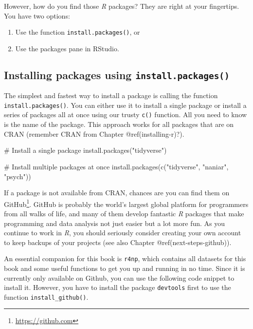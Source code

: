 \documentclass[
  letterpaper,
]{krantz}
\makeatletter
\newenvironment{Shaded}{\begin{snugshade}}{\end{snugshade}}
\newcommand{\CommentTok}[1]{\textcolor[rgb]{0.37,0.37,0.37}{#1}}
\newcommand{\FunctionTok}[1]{\textcolor[rgb]{0.28,0.35,0.67}{#1}}
\newcommand{\NormalTok}[1]{\textcolor[rgb]{0.00,0.23,0.31}{#1}}
\newcommand{\StringTok}[1]{\textcolor[rgb]{0.13,0.47,0.30}{#1}}
\renewcommand{\href}[2]{#2\footnote{\url{#1}}}
\newenvironment{kframe}{%
\medskip{}
\setlength{\fboxsep}{.8em}
 \def\at@end@of@kframe{}%
 \ifinner\ifhmode%
  \def\at@end@of@kframe{\end{minipage}}%
  \begin{minipage}{\columnwidth}%
 \fi\fi%
 \def\FrameCommand##1{\hskip\@totalleftmargin \hskip-\fboxsep
 \colorbox{shadecolor}{##1}\hskip-\fboxsep
     \hskip-\linewidth \hskip-\@totalleftmargin \hskip\columnwidth}%
 \MakeFramed {\advance\hsize-\width
   \@totalleftmargin\z@ \linewidth\hsize
   \@setminipage}}%
 {\par\unskip\endMakeFramed%
 \at@end@of@kframe}
\renewenvironment{Shaded}{\begin{kframe}}{\end{kframe}}
\makeatother
\begin{document}
However, how do you find those \emph{R} packages? They are right at your
fingertips. You have two options:

\begin{enumerate}
\def\labelenumi{\arabic{enumi}.}
\item
  Use the function \texttt{install.packages()}, or
\item
  Use the packages pane in RStudio.
\end{enumerate}

\subsection{\texorpdfstring{Installing packages using
\texttt{install.packages()}}{Installing packages using install.packages()}}\label{sec-installing-packages-using-a-function}

The simplest and fastest way to install a package is calling the
function \texttt{install.packages()}. You can either use it to install a
single package or install a series of packages all at once using our
trusty \texttt{c()} function. All you need to know is the name of the
package. This approach works for all packages that are on CRAN (remember
CRAN from Chapter @ref(installing-r)?).

\begin{Shaded}
\begin{Highlighting}[]
\CommentTok{\# Install a single package}
\FunctionTok{install.packages}\NormalTok{(}\StringTok{"tidyverse"}\NormalTok{)}

\CommentTok{\# Install multiple packages at once}
\FunctionTok{install.packages}\NormalTok{(}\FunctionTok{c}\NormalTok{(}\StringTok{"tidyverse"}\NormalTok{, }\StringTok{"naniar"}\NormalTok{, }\StringTok{"psych"}\NormalTok{))}
\end{Highlighting}
\end{Shaded}

If a package is not available from CRAN, chances are you can find them
on \href{https://github.com}{GitHub}. GitHub is probably the world's
largest global platform for programmers from all walks of life, and many
of them develop fantastic \emph{R} packages that make programming and
data analysis not just easier but a lot more fun. As you continue to
work in \emph{R}, you should seriously consider creating your own
account to keep backups of your projects (see also Chapter
@ref(next-steps-github)).

An essential companion for this book is \texttt{r4np}, which contains
all datasets for this book and some useful functions to get you up and
running in no time. Since it is currently only available on Github, you
can use the following code snippet to install it. However, you have to
install the package \texttt{devtools} first to use the function
\texttt{install\_github()}.
\end{document}
